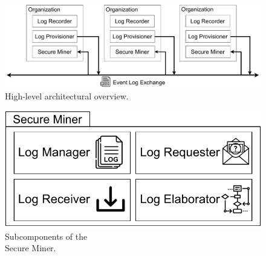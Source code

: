 \begin{figure}[t]
	\centering
	\includegraphics[width=0.9\linewidth]{content/figures/architecturediagramsad.pdf}
	\caption{High-level architectural overview.}
	\label{fig:architecture_diagram}
\end{figure}

\begin{figure}
	\vspace{-2em}
	\centering
	\includegraphics[width=1\textwidth]{content/figures/secureminersad.pdf}
	\caption[A gull]{Subcomponents of the \\Secure Miner.}
	\label{fig:trusted_miner}
	\vspace{-6pt}
\end{figure} 
